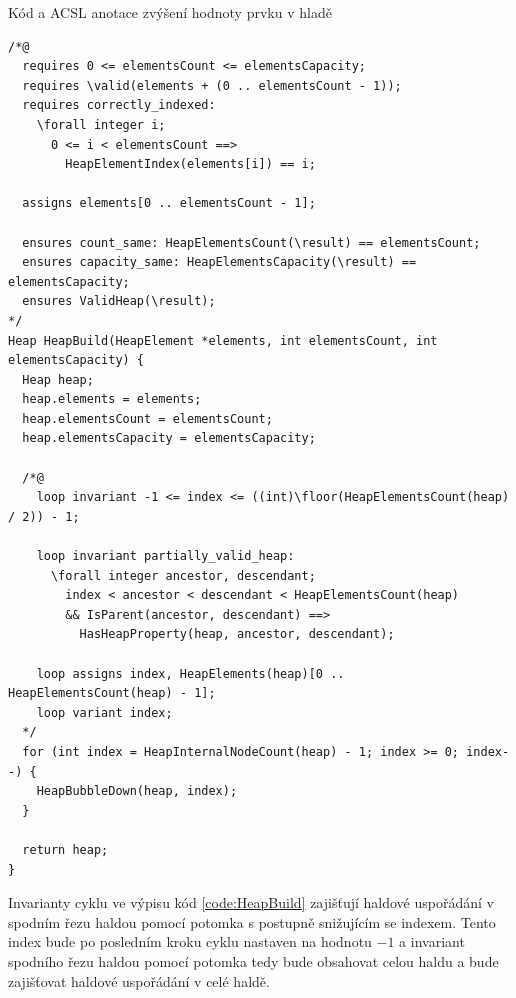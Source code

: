 \begin{listing}[H]
	\caption{Kód a ACSL anotace zvýšení hodnoty prvku v hladě}
	\label{code:HeapBuild}
	\begin{verbatim}
/*@
  requires 0 <= elementsCount <= elementsCapacity;
  requires \valid(elements + (0 .. elementsCount - 1));
  requires correctly_indexed:
    \forall integer i;
      0 <= i < elementsCount ==>
        HeapElementIndex(elements[i]) == i;

  assigns elements[0 .. elementsCount - 1];

  ensures count_same: HeapElementsCount(\result) == elementsCount;
  ensures capacity_same: HeapElementsCapacity(\result) == elementsCapacity;
  ensures ValidHeap(\result);
*/
Heap HeapBuild(HeapElement *elements, int elementsCount, int elementsCapacity) {
  Heap heap;
  heap.elements = elements;
  heap.elementsCount = elementsCount;
  heap.elementsCapacity = elementsCapacity;

  /*@
    loop invariant -1 <= index <= ((int)\floor(HeapElementsCount(heap) / 2)) - 1;

    loop invariant partially_valid_heap:
      \forall integer ancestor, descendant;
        index < ancestor < descendant < HeapElementsCount(heap)
        && IsParent(ancestor, descendant) ==>
          HasHeapProperty(heap, ancestor, descendant);

    loop assigns index, HeapElements(heap)[0 .. HeapElementsCount(heap) - 1];
    loop variant index;
  */
  for (int index = HeapInternalNodeCount(heap) - 1; index >= 0; index--) {
    HeapBubbleDown(heap, index);
  }

  return heap;
}
	\end{verbatim}
\end{listing}

Invarianty cyklu ve výpisu kód \ref{code:HeapBuild} zajišťují haldové uspořádání v spodním řezu haldou pomocí potomka s postupně snižujícím se indexem. Tento index bude po posledním kroku cyklu nastaven na hodnotu $-1$ a invariant spodního řezu haldou pomocí potomka tedy bude obsahovat celou haldu a bude zajišťovat haldové uspořádání v celé haldě.

%
%
%


